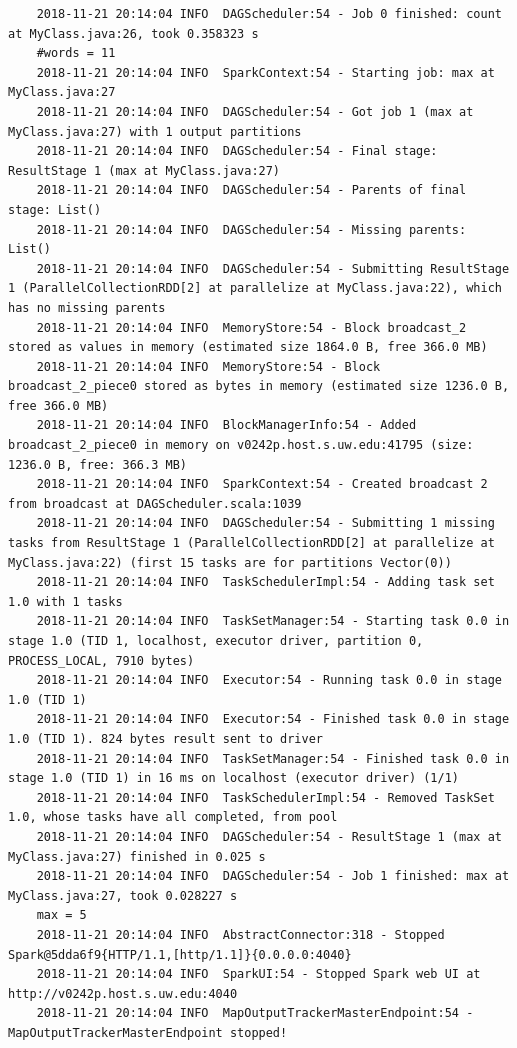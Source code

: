 \documentclass[11pt, letterpaper]{article}
\begin{document}
\begin{lstlisting}
	2018-11-21 20:14:04 INFO  DAGScheduler:54 - Job 0 finished: count at MyClass.java:26, took 0.358323 s
	#words = 11
	2018-11-21 20:14:04 INFO  SparkContext:54 - Starting job: max at MyClass.java:27
	2018-11-21 20:14:04 INFO  DAGScheduler:54 - Got job 1 (max at MyClass.java:27) with 1 output partitions
	2018-11-21 20:14:04 INFO  DAGScheduler:54 - Final stage: ResultStage 1 (max at MyClass.java:27)
	2018-11-21 20:14:04 INFO  DAGScheduler:54 - Parents of final stage: List()
	2018-11-21 20:14:04 INFO  DAGScheduler:54 - Missing parents: List()
	2018-11-21 20:14:04 INFO  DAGScheduler:54 - Submitting ResultStage 1 (ParallelCollectionRDD[2] at parallelize at MyClass.java:22), which has no missing parents
	2018-11-21 20:14:04 INFO  MemoryStore:54 - Block broadcast_2 stored as values in memory (estimated size 1864.0 B, free 366.0 MB)
	2018-11-21 20:14:04 INFO  MemoryStore:54 - Block broadcast_2_piece0 stored as bytes in memory (estimated size 1236.0 B, free 366.0 MB)
	2018-11-21 20:14:04 INFO  BlockManagerInfo:54 - Added broadcast_2_piece0 in memory on v0242p.host.s.uw.edu:41795 (size: 1236.0 B, free: 366.3 MB)
	2018-11-21 20:14:04 INFO  SparkContext:54 - Created broadcast 2 from broadcast at DAGScheduler.scala:1039
	2018-11-21 20:14:04 INFO  DAGScheduler:54 - Submitting 1 missing tasks from ResultStage 1 (ParallelCollectionRDD[2] at parallelize at MyClass.java:22) (first 15 tasks are for partitions Vector(0))
	2018-11-21 20:14:04 INFO  TaskSchedulerImpl:54 - Adding task set 1.0 with 1 tasks
	2018-11-21 20:14:04 INFO  TaskSetManager:54 - Starting task 0.0 in stage 1.0 (TID 1, localhost, executor driver, partition 0, PROCESS_LOCAL, 7910 bytes)
	2018-11-21 20:14:04 INFO  Executor:54 - Running task 0.0 in stage 1.0 (TID 1)
	2018-11-21 20:14:04 INFO  Executor:54 - Finished task 0.0 in stage 1.0 (TID 1). 824 bytes result sent to driver
	2018-11-21 20:14:04 INFO  TaskSetManager:54 - Finished task 0.0 in stage 1.0 (TID 1) in 16 ms on localhost (executor driver) (1/1)
	2018-11-21 20:14:04 INFO  TaskSchedulerImpl:54 - Removed TaskSet 1.0, whose tasks have all completed, from pool
	2018-11-21 20:14:04 INFO  DAGScheduler:54 - ResultStage 1 (max at MyClass.java:27) finished in 0.025 s
	2018-11-21 20:14:04 INFO  DAGScheduler:54 - Job 1 finished: max at MyClass.java:27, took 0.028227 s
	max = 5
	2018-11-21 20:14:04 INFO  AbstractConnector:318 - Stopped Spark@5dda6f9{HTTP/1.1,[http/1.1]}{0.0.0.0:4040}
	2018-11-21 20:14:04 INFO  SparkUI:54 - Stopped Spark web UI at http://v0242p.host.s.uw.edu:4040
	2018-11-21 20:14:04 INFO  MapOutputTrackerMasterEndpoint:54 - MapOutputTrackerMasterEndpoint stopped!

\end{lstlisting}
\end{document}
